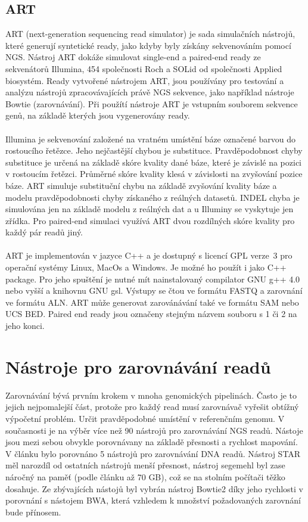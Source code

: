 \documentclass[czech,DP]{thesiskiv}
\numberwithin{equation}{section}
\begin{document}
\subsection{ART}
ART (next-generation sequencing read simulator) je sada simulačních nástrojů, které generují syntetické ready, jako kdyby byly získány sekvenováním pomocí NGS. Nástroj ART dokáže simulovat single-end a paired-end ready ze sekvenátorů Illumina, 454 společnosti Roch a SOLid od společnosti Applied biosystém. Ready vytvořené nástrojem ART, jsou používány pro testování a analýzu nástrojů zpracovávajících právě NGS sekvence, jako například nástroje Bowtie (zarovnávání). Při použítí nástroje ART je vstupním souborem sekvence genů, na základě kterých jsou vygenerovány ready. \cite{art}
\\
\\
Illumina je sekvenování založené na vratném umístění báze označené barvou do rostoucího řetězce. Jeho nejčastější chybou je substituce. Pravděpodobnost chyby substituce je určená na základě skóre kvality dané báze, které je závislé na pozici v rostoucím řetězci. Průměrné skóre kvality klesá v závislosti na zvyšování pozice báze. ART simuluje substituční chybu na základě zvyšování kvality báze a modelu pravděpodobnosti chyby získaného z reálných datasetů. INDEL chyba je simulována jen na základě modelu z reálných dat a u Illuminy se vyskytuje jen zřídka. Pro paired-end simulaci využívá ART dvou rozdílných skóre kvality pro každý pár readů jiný. 
\\
\\
ART je implementován v jazyce C++ a je dostupný s licencí GPL verze~3 pro operační systémy Linux, MacOs a Windows. Je možné ho použít i jako C++ package. Pro jeho spuštění je nutné mít nainstalovaný compilator GNU g++ 4.0 nebo vyšší a knihovnu GNU gsl. Výstupy se čtou ve formátu FASTQ a zarovnání ve formátu ALN. ART může generovat zarovánávání také ve formátu SAM nebo UCS BED. Paired end ready jsou označeny stejným názvem souboru s 1 či 2 na jeho konci.

\section{Nástroje pro zarovnávání readů}
Zarovnávání bývá prvním krokem v mnoha genomických pipelinách. Často je to jejich nejpomalejší část, protože pro každý read musí zarovnávač vyřešit obtížný výpočetní problém. Určit pravděpodobné umístění v referenčním genomu. 
V současnosti je na výběr více než 90 nástrojů pro zarovnávání NGS readů.
Nástoje jsou mezi sebou obvykle porovnávany na základě přesnosti a rychlost mapování. V článku \cite{ngs_alignment_software} bylo porovnáno 5 nástrojů pro zarovnávání DNA readů.  Nástroj STAR měl narozdíl od ostatních nástrojů menší přesnost, nástroj segemehl byl zase náročný na paměť (podle článku až 70 GB), což se na stolním počítači těžko dosahuje. Ze zbývajících nástojů byl vybrán nástroj Bowtie2 díky jeho rychlosti v porovnání s nástojem BWA, která vzhledem k množství požadovaných zarovnání bude přínosem.  
\end{document}
